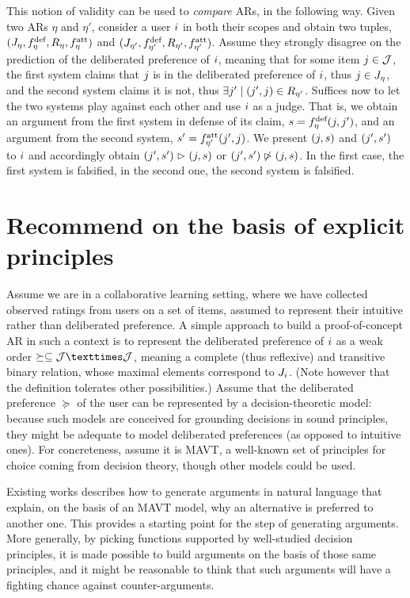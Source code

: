 \documentclass[french, english]{da2pl2018}
\begin{document}
This notion of validity can be used to \emph{compare} \acp{AR}, in the following way. Given two \acp{AR} $\eta$ and $\eta'$, consider a user $\usr$ in both their scopes and obtain two tuples, $(\mitems, \mdef, R_\eta, \matt)$ and $(\mitems[\eta'], \mdef[\eta'], R_{\eta'}, \matt[\eta'])$. Assume they strongly disagree on the prediction of the deliberated preference of $\usr$, meaning that for some item $\itm \in \allitems$, the first system claims that $\itm$ is in the deliberated preference of $\usr$, thus $\itm \in \mitems$, and the second system claims it is not, thus $\exists \itm' \suchthat (\itm', \itm) \in R_{\eta'}$. Suffices now to let the two systems play against each other and use $\usr$ as a judge. That is, we obtain an argument from the first system in defense of its claim, $\ar = \mdef(\itm, \itm')$, and an argument from the second system, $\ar' = \matt[\eta'](\itm', \itm)$. We present $(\itm, \ar)$ and $(\itm', \ar')$ to $\usr$ and accordingly obtain $(\itm', \ar') \ibeats (\itm, \ar)$ or $(\itm', \ar') \nibeats (\itm, \ar)$. In the first case, the first system is falsified, in the second one, the second system is falsified.

\section{Recommend on the basis of explicit principles}
\label{sec:princ}
Assume we are in a collaborative learning setting, where we have collected observed ratings from users on a set of items, assumed to represent their intuitive rather than deliberated preference. 
A simple approach to build a proof-of-concept \ac{AR} in such a context is to represent the deliberated preference of $\usr$ as a weak order $\succeq \subseteq \allitems × \allitems$, meaning a complete (thus reflexive) and transitive binary relation, whose maximal elements correspond to $\uitems$. (Note however that the definition tolerates other possibilities.)
Assume that the deliberated preference $\succeq$ of the user can be represented by a decision-theoretic model: because such models are conceived for grounding decisions in sound principles, they might be adequate to model deliberated preferences (as opposed to intuitive ones). For concreteness, assume it is \ac{MAVT}, a well-known set of principles for choice coming from decision theory, though other models could be used.

Existing works \citep{carenini_generating_2006, labreuche_general_2011} describes how to generate arguments in natural language that explain, on the basis of an \ac{MAVT} model, why an alternative is preferred to another one. This provides a starting point for the step of generating arguments.
More generally, by picking functions supported by well-studied decision principles, it is made possible to build arguments on the basis of those same principles, and it might be reasonable to think that such arguments will have a fighting chance against counter-arguments.
\end{document}
